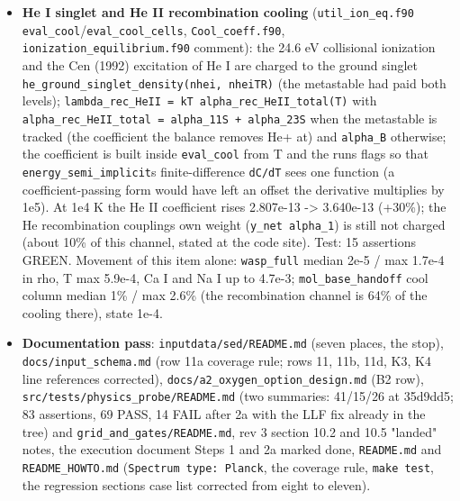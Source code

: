\documentclass[english,a4paper]{my_memo}
\begin{document}
\begin{itemize}
  (median +2.7\%), n(H2) -20\% and n(H3+) -20\% at the front r = 1.071, T up to
  8e-3, n\_e 1.7e-2; \texttt{mol\_base\_handoff} and \texttt{wasp\_full} identical (no LW
  flux). Cost under 0.5\%.
\item
  \textbf{He I singlet and He II recombination cooling} (\texttt{util\_ion\_eq.f90}
  \texttt{eval\_cool}/\texttt{eval\_cool\_cells}, \texttt{Cool\_coeff.f90},
  \texttt{ionization\_equilibrium.f90} comment): the 24.6 eV collisional ionization
  and the Cen (1992) excitation of He I are charged to the ground singlet
  \texttt{he\_ground\_singlet\_density(nhei,\ nheiTR)} (the metastable had paid both
  levels); \texttt{lambda\_rec\_HeII\ =\ kT\ alpha\_rec\_HeII\_total(T)} with
  \texttt{alpha\_rec\_HeII\_total\ =\ alpha\_11S\ +\ alpha\_23S} when the metastable is
  tracked (the coefficient the balance removes He+ at) and \texttt{alpha\_B}
  otherwise; the coefficient is built inside \texttt{eval\_cool} from T and the run\textquotesingle s
  flags so that \texttt{energy\_semi\_implicit}\textquotesingle s finite-difference \texttt{dC/dT} sees one
  function (a coefficient-passing form would have left an offset the
  derivative multiplies by 1e5). At 1e4 K the He II coefficient rises
  2.807e-13 -\textgreater{} 3.640e-13 (+30\%); the He recombination coupling\textquotesingle s own weight
  (\texttt{y\_net\ alpha\_1}) is still not charged (about 10\% of this channel, stated at
  the code site). Test: 15 assertions GREEN. Movement of this item alone:
  \texttt{wasp\_full} median 2e-5 / max 1.7e-4 in rho, T max 5.9e-4, Ca I and Na I
  up to 4.7e-3; \texttt{mol\_base\_handoff} cool column median 1\% / max 2.6\% (the
  recombination channel is 64\% of the cooling there), state 1e-4.
\item
  \textbf{Documentation pass}: \texttt{inputdata/sed/README.md} (seven places, the
  stop), \texttt{docs/input\_schema.md} (row 11a coverage rule; rows 11, 11b, 11d,
  K3, K4 line references corrected), \texttt{docs/a2\_oxygen\_option\_design.md}
  (B2 row), \texttt{src/tests/physics\_probe/README.md} (two summaries: 41/15/26 at
  35d9dd5; 83 assertions, 69 PASS, 14 FAIL after 2a with the LLF fix already
  in the tree) and \texttt{grid\_and\_gates/README.md}, rev 3 section 10.2 and 10.5
  "landed" notes, the execution document Steps 1 and 2a marked done,
  \texttt{README.md} and \texttt{README\_HOWTO.md} (\texttt{Spectrum\ type:\ Planck}, the coverage
  rule, \texttt{make\ test}, the regression section\textquotesingle s case list corrected from
  eight to eleven).
\end{itemize}
\end{document}
